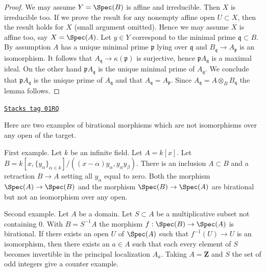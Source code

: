 \begin{proof}
We may assume $Y = \Spec(B)$ is affine and irreducible.
Then $X$ is irreducible too. If we prove the result for any nonempty
affine open $U \subset X$, then the result holds for $X$
(small argument omitted). Hence we may assume $X$
is affine too, say $X = \Spec(A)$.
Let $y \in Y$ correspond to the minimal prime $\mathfrak q \subset B$.
By assumption $A$ has a unique minimal prime $\mathfrak p$ lying
over $\mathfrak q$ and $B_\mathfrak q \to A_\mathfrak p$ is an isomorphism.
It follows that $A_\mathfrak q \to \kappa(\mathfrak p)$ is surjective,
hence $\mathfrak p A_\mathfrak q$ is a maximal ideal. On the other hand
$\mathfrak p A_\mathfrak q$ is the unique minimal prime of $A_\mathfrak q$.
We conclude that $\mathfrak p A_\mathfrak q$ is the unique prime of
$A_\mathfrak q$ and that $A_\mathfrak q = A_\mathfrak p$. Since
$A_\mathfrak q = A \otimes_B B_\mathfrak q$ the lemma follows.
\end{proof}

\begin{example}
\label{morphisms-example-birational-not-iso-over-open}
\href{https://stacks.math.columbia.edu/tag/01RQ}{\texttt{Stacks tag 01RQ}}

Here are two examples of birational morphisms which are not isomorphisms
over any open of the target.

\medskip\noindent
First example. Let $k$ be an infinite field. Let $A = k[x]$. Let
$B = k[x, \{y_{\alpha}\}_{\alpha \in k}]/
((x-\alpha)y_\alpha, y_\alpha y_\beta)$.
There is an inclusion $A \subset B$ and a retraction $B \to A$
setting all $y_\alpha$ equal to zero.
Both the morphism $\Spec(A) \to \Spec(B)$
and the morphism $\Spec(B) \to \Spec(A)$ are birational
but not an isomorphism over any open.

\medskip\noindent
Second example. Let $A$ be a domain. Let $S \subset A$ be a multiplicative
subset not containing $0$.
With $B = S^{-1}A$ the morphism $f : \Spec(B) \to \Spec(A)$
is birational. If there exists an open $U$ of $\Spec(A)$
such that $f^{-1}(U) \to U$ is an isomorphism, then there exists an
$a \in A$ such that each every element of $S$ becomes invertible
in the principal localization $A_a$. Taking $A = \mathbf{Z}$
and $S$ the set of odd integers give a counter example.
\end{example}

